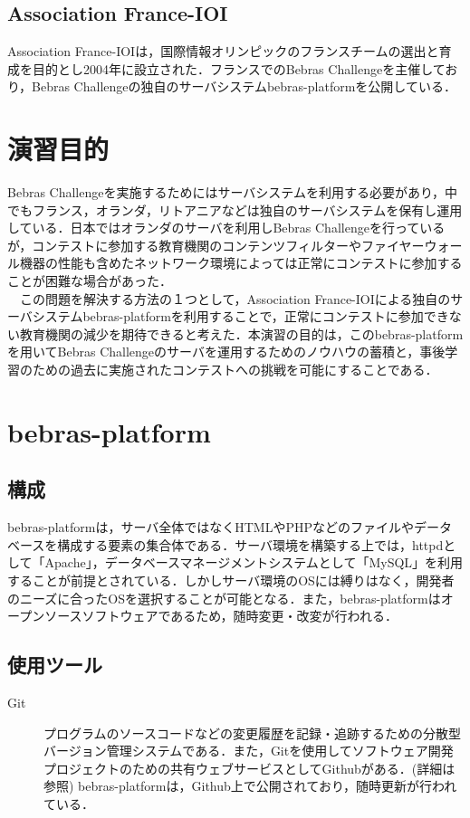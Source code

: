 \documentclass[a4paper]{jarticle}
\begin{document}
\begin{multicols}{2}
\subsection{Association France-IOI}
Association France-IOIは，国際情報オリンピックのフランスチームの選出と育成を目的とし2004年に設立された．フランスでのBebras Challengeを主催しており，Bebras Challengeの独自のサーバシステムbebras-platformを公開している．

\section{演習目的}
Bebras Challengeを実施するためにはサーバシステムを利用する必要があり，中でもフランス，オランダ，リトアニアなどは独自のサーバシステムを保有し運用している．日本ではオランダのサーバを利用しBebras Challengeを行っているが，コンテストに参加する教育機関のコンテンツフィルターやファイヤーウォール機器の性能も含めたネットワーク環境によっては正常にコンテストに参加することが困難な場合があった．
\\　この問題を解決する方法の１つとして，Association France-IOIによる独自のサーバシステムbebras-platformを利用することで，正常にコンテストに参加できない教育機関の減少を期待できると考えた．本演習の目的は，このbebras-platformを用いてBebras Challengeのサーバを運用するためのノウハウの蓄積と，事後学習のための過去に実施されたコンテストへの挑戦を可能にすることである．

\section{bebras-platform}


\subsection{構成}
bebras-platformは，サーバ全体ではなくHTMLやPHPなどのファイルやデータベースを構成する要素の集合体である．サーバ環境を構築する上では，httpdとして「Apache」，データベースマネージメントシステムとして「MySQL」を利用することが前提とされている．しかしサーバ環境のOSには縛りはなく，開発者のニーズに合ったOSを選択することが可能となる．また，bebras-platformはオープンソースソフトウェアであるため，随時変更・改変が行われる．

\subsection{使用ツール}
\begin{description}
\item[Git]プログラムのソースコードなどの変更履歴を記録・追跡するための分散型バージョン管理システムである．また，Gitを使用してソフトウェア開発プロジェクトのための共有ウェブサービスとしてGithubがある．(詳細は\cite{git}参照) bebras-platformは，Github上で公開されており，随時更新が行われている．
\end{description}


\end{multicols}
\end{document}

